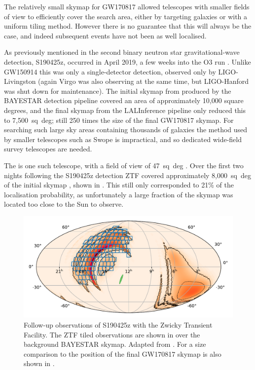 \begin{colsection}
\begin{colsection}
The relatively small skymap for GW170817 allowed telescopes with smaller fields of view to efficiently cover the search area, either by targeting galaxies or with a uniform tiling method. However there is no guarantee that this will always be the case, and indeed subsequent events have not been as well localised.

As previously mentioned in  the second binary neutron star gravitational-wave detection, S190425z, occurred in April 2019, a few weeks into the O3 run \citep{S190425z}. Unlike GW150914 this was only a single-detector detection, observed only by LIGO-Livingston (again Virgo was also observing at the same time, but LIGO-Hanford was shut down for maintenance). The initial skymap from produced by the BAYESTAR detection pipeline \citep{BAYESTAR} covered an area of approximately 10,000 square degrees, and the final skymap from the LALInference pipeline \citep{LALInference} only reduced this to 7,500~sq~deg; still 250 times the size of the final GW170817 skymap. For searching such large sky areas containing thousands of galaxies the method used by smaller telescopes such as Swope is impractical, and so dedicated wide-field survey telescopes are needed.

The  is one such telescope, with a field of view of 47~sq~deg \citep{ZTF}. Over the first two nights following the S190425z detection ZTF covered approximately 8,000~sq~deg of the initial skymap \citep{S190425z_ZTF}, shown in . This still only corresponded to 21\% of the localisation probability, as unfortunately a large fraction of the skymap was located too close to the Sun to observe.

\newpage

\begin{figure}[t]
    \begin{center}
        \includegraphics[width=0.9\linewidth]{images/190425_ztf.pdf}
    \end{center}
    \caption[Follow-up observations of S190425z with ZTF]{
        Follow-up observations of S190425z with the Zwicky Transient Facility. The ZTF tiled observations are shown in  over the background BAYESTAR skymap. Adapted from \citet{S190425z_ZTF}. For a size comparison to  the position of the final GW170817 skymap is also shown in .
        }\label{fig:ztf}
\end{figure}


\end{colsection}
\end{colsection}
